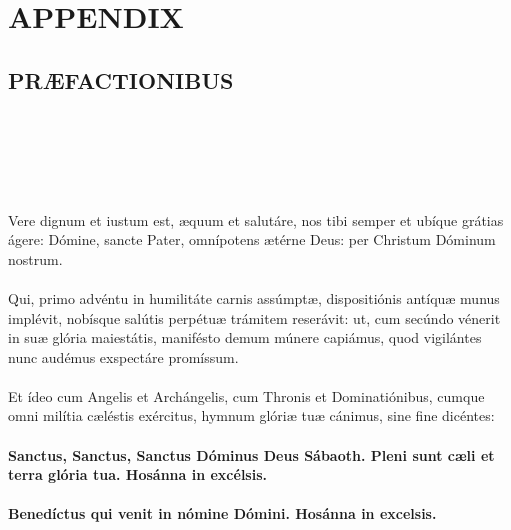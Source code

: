 \documentclass[12pt, a4paper]{article}
\begin{document}
	\section*{APPENDIX}
	
	\subsection*{PRÆFACTIONIBUS}
	
	\\
	\\
	\\
	\\
	\\
	Vere dignum et iustum est, æquum
	et salutáre, nos tibi semper et
	ubíque grátias ágere: Dómine,
	sancte Pater, omnípotens ætérne
	Deus: per Christum Dóminum
	nostrum.
	\\\\
	Qui, primo advéntu in humilitáte
	carnis assúmptæ, dispositiónis
	antíquæ munus implévit, nobísque
	salútis perpétuæ trámitem reserávit:
	ut, cum secúndo vénerit in suæ
	glória maiestátis, manifésto demum
	múnere capiámus, quod vigilántes
	nunc audémus exspectáre
	promíssum.
	\\\\
	Et ídeo cum Angelis et
	Archángelis, cum Thronis et
	Dominatiónibus, cumque omni
	milítia cæléstis exércitus, hymnum
	glóriæ tuæ cánimus, sine fine
	dicéntes:
	\\\\
	\textbf{Sanctus, Sanctus, Sanctus Dóminus
		Deus Sábaoth. Pleni sunt cæli et
		terra glória tua. Hosánna in
		excélsis.}
	\\\\
	\textbf{Benedíctus qui venit in nómine
		Dómini. Hosánna in excelsis.}
	
	\newpage
	
\end{document}
